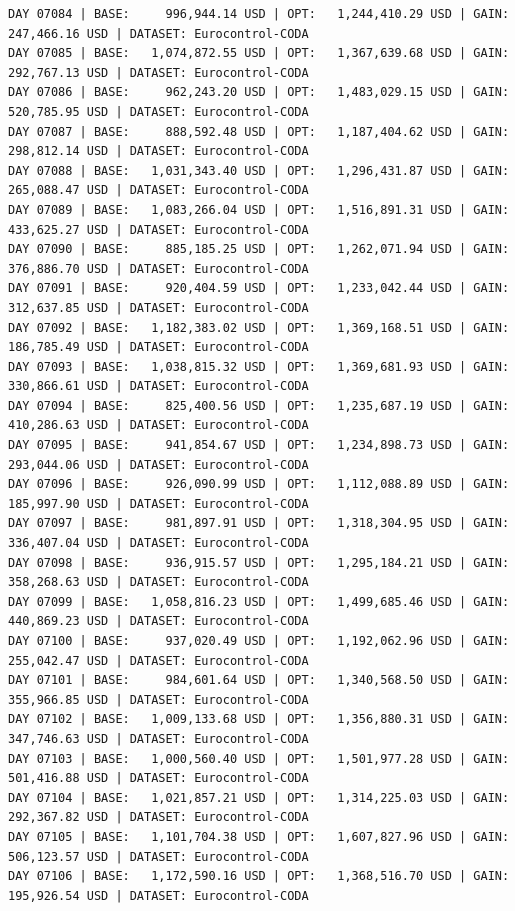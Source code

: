 \documentclass[11pt,a4paper]{article}
\begin{document}
\begin{verbatim}
DAY 07084 | BASE:     996,944.14 USD | OPT:   1,244,410.29 USD | GAIN: 247,466.16 USD | DATASET: Eurocontrol-CODA
DAY 07085 | BASE:   1,074,872.55 USD | OPT:   1,367,639.68 USD | GAIN: 292,767.13 USD | DATASET: Eurocontrol-CODA
DAY 07086 | BASE:     962,243.20 USD | OPT:   1,483,029.15 USD | GAIN: 520,785.95 USD | DATASET: Eurocontrol-CODA
DAY 07087 | BASE:     888,592.48 USD | OPT:   1,187,404.62 USD | GAIN: 298,812.14 USD | DATASET: Eurocontrol-CODA
DAY 07088 | BASE:   1,031,343.40 USD | OPT:   1,296,431.87 USD | GAIN: 265,088.47 USD | DATASET: Eurocontrol-CODA
DAY 07089 | BASE:   1,083,266.04 USD | OPT:   1,516,891.31 USD | GAIN: 433,625.27 USD | DATASET: Eurocontrol-CODA
DAY 07090 | BASE:     885,185.25 USD | OPT:   1,262,071.94 USD | GAIN: 376,886.70 USD | DATASET: Eurocontrol-CODA
DAY 07091 | BASE:     920,404.59 USD | OPT:   1,233,042.44 USD | GAIN: 312,637.85 USD | DATASET: Eurocontrol-CODA
DAY 07092 | BASE:   1,182,383.02 USD | OPT:   1,369,168.51 USD | GAIN: 186,785.49 USD | DATASET: Eurocontrol-CODA
DAY 07093 | BASE:   1,038,815.32 USD | OPT:   1,369,681.93 USD | GAIN: 330,866.61 USD | DATASET: Eurocontrol-CODA
DAY 07094 | BASE:     825,400.56 USD | OPT:   1,235,687.19 USD | GAIN: 410,286.63 USD | DATASET: Eurocontrol-CODA
DAY 07095 | BASE:     941,854.67 USD | OPT:   1,234,898.73 USD | GAIN: 293,044.06 USD | DATASET: Eurocontrol-CODA
DAY 07096 | BASE:     926,090.99 USD | OPT:   1,112,088.89 USD | GAIN: 185,997.90 USD | DATASET: Eurocontrol-CODA
DAY 07097 | BASE:     981,897.91 USD | OPT:   1,318,304.95 USD | GAIN: 336,407.04 USD | DATASET: Eurocontrol-CODA
DAY 07098 | BASE:     936,915.57 USD | OPT:   1,295,184.21 USD | GAIN: 358,268.63 USD | DATASET: Eurocontrol-CODA
DAY 07099 | BASE:   1,058,816.23 USD | OPT:   1,499,685.46 USD | GAIN: 440,869.23 USD | DATASET: Eurocontrol-CODA
DAY 07100 | BASE:     937,020.49 USD | OPT:   1,192,062.96 USD | GAIN: 255,042.47 USD | DATASET: Eurocontrol-CODA
DAY 07101 | BASE:     984,601.64 USD | OPT:   1,340,568.50 USD | GAIN: 355,966.85 USD | DATASET: Eurocontrol-CODA
DAY 07102 | BASE:   1,009,133.68 USD | OPT:   1,356,880.31 USD | GAIN: 347,746.63 USD | DATASET: Eurocontrol-CODA
DAY 07103 | BASE:   1,000,560.40 USD | OPT:   1,501,977.28 USD | GAIN: 501,416.88 USD | DATASET: Eurocontrol-CODA
DAY 07104 | BASE:   1,021,857.21 USD | OPT:   1,314,225.03 USD | GAIN: 292,367.82 USD | DATASET: Eurocontrol-CODA
DAY 07105 | BASE:   1,101,704.38 USD | OPT:   1,607,827.96 USD | GAIN: 506,123.57 USD | DATASET: Eurocontrol-CODA
DAY 07106 | BASE:   1,172,590.16 USD | OPT:   1,368,516.70 USD | GAIN: 195,926.54 USD | DATASET: Eurocontrol-CODA

\end{verbatim}
\end{document}
